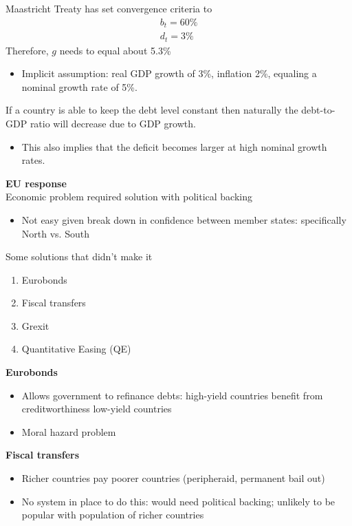 \documentclass{beamer}
\begin{document}
\begin{frame}
  Maastricht Treaty has set convergence criteria to
  \begin{align*}
    b_t=60\%\\
    d_t=3\%
  \end{align*}
  \medskip
  Therefore, $g$ needs to equal about 5.3\%
   \begin{itemize}
     \item Implicit assumption: real GDP growth of 3\%, inflation  2\%, equaling a nominal growth rate of 5\%.  
   \end{itemize} 
   \medskip
   If a country is able to keep the debt level constant then naturally the debt-to-GDP ratio will decrease due to GDP growth. 
   \begin{itemize}
     \item This also implies that the deficit becomes larger at high nominal growth rates.  
   \end{itemize}
\end{frame}


\begin{frame}
  \textbf{EU response}\\
  Economic problem required solution with political backing
  \begin{itemize}
    \item Not easy given break down in confidence between member states: specifically North vs. South    
  \end{itemize}
  \medskip
  Some solutions that didn't make it
  \begin{enumerate}
    \item Eurobonds
    \item Fiscal transfers
    \item Grexit
    \item Quantitative Easing (QE)
  \end{enumerate}
 \end{frame}

\begin{frame}
  \textbf{Eurobonds}
  \begin{itemize}
    \item Allows government to refinance debts: high-yield countries benefit from creditworthiness low-yield countries
    \item Moral hazard problem
  \end{itemize}
  \medskip
  \textbf{Fiscal transfers}
  \begin{itemize}
    \item Richer countries pay poorer countries (peripheraid, permanent bail out)
    \item No system in place to do this: would need political backing;  unlikely to be popular with population of richer countries    
  \end{itemize}
\end{frame}
\end{document}
